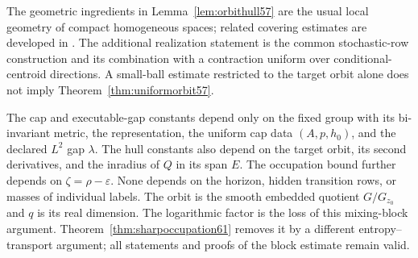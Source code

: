 The geometric ingredients in Lemma~\ref{lem:orbithull57} are the usual local geometry of compact homogeneous spaces; related covering estimates are developed in \cite{Szarek57}. The additional realization statement is the common stochastic-row construction and its combination with a contraction uniform over conditional-centroid directions. A small-ball estimate restricted to the target orbit alone does not imply Theorem~\ref{thm:uniformorbit57}.

\begin{remark}
The cap and executable-gap constants depend only on the fixed group with
its bi-invariant metric, the representation, the uniform cap data
$(A,p,h_0)$, and the declared $L^2$ gap $\lambda$. The hull constants also
depend on the target orbit, its second derivatives, and the inradius of
$Q$ in its span $E$. The occupation bound further depends on
$\zeta=\rho-\varepsilon$. None depends on the horizon, hidden transition
rows, or masses of individual labels. The orbit is the smooth embedded
quotient $G/G_{z_0}$ and $q$ is its real dimension. The logarithmic factor
is the loss of this mixing-block argument.
Theorem~\ref{thm:sharpoccupation61} removes it by a different
entropy--transport argument; all statements and proofs of the block
estimate remain valid.
\end{remark}
